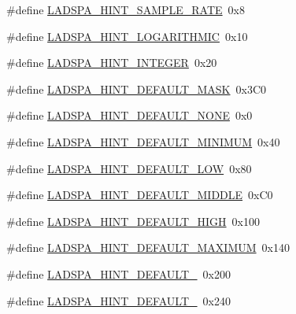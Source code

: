 \begin{DoxyCompactItemize}
\#define \hyperlink{win_2_l_a_d_s_p_a__plugins-win_2ladspa_8h_a184adf73da5ec410abfce239de960826}{L\+A\+D\+S\+P\+A\+\_\+\+H\+I\+N\+T\+\_\+\+S\+A\+M\+P\+L\+E\+\_\+\+R\+A\+TE}~0x8
\item 
\#define \hyperlink{win_2_l_a_d_s_p_a__plugins-win_2ladspa_8h_a98bd5b7702b500dc6cad0fcfe02312a9}{L\+A\+D\+S\+P\+A\+\_\+\+H\+I\+N\+T\+\_\+\+L\+O\+G\+A\+R\+I\+T\+H\+M\+IC}~0x10
\item 
\#define \hyperlink{win_2_l_a_d_s_p_a__plugins-win_2ladspa_8h_a5bf65328a41d04440216bc932fe2bd16}{L\+A\+D\+S\+P\+A\+\_\+\+H\+I\+N\+T\+\_\+\+I\+N\+T\+E\+G\+ER}~0x20
\item 
\#define \hyperlink{win_2_l_a_d_s_p_a__plugins-win_2ladspa_8h_a713062e0f0ae5956e12a217323c2a100}{L\+A\+D\+S\+P\+A\+\_\+\+H\+I\+N\+T\+\_\+\+D\+E\+F\+A\+U\+L\+T\+\_\+\+M\+A\+SK}~0x3\+C0
\item 
\#define \hyperlink{win_2_l_a_d_s_p_a__plugins-win_2ladspa_8h_ae88ecad8aea142f9d970981cf2e011f6}{L\+A\+D\+S\+P\+A\+\_\+\+H\+I\+N\+T\+\_\+\+D\+E\+F\+A\+U\+L\+T\+\_\+\+N\+O\+NE}~0x0
\item 
\#define \hyperlink{win_2_l_a_d_s_p_a__plugins-win_2ladspa_8h_ac5362d0480a9291abaa0e24475a90683}{L\+A\+D\+S\+P\+A\+\_\+\+H\+I\+N\+T\+\_\+\+D\+E\+F\+A\+U\+L\+T\+\_\+\+M\+I\+N\+I\+M\+UM}~0x40
\item 
\#define \hyperlink{win_2_l_a_d_s_p_a__plugins-win_2ladspa_8h_a2396275a1c6a7b3eafd6ef1481723ebb}{L\+A\+D\+S\+P\+A\+\_\+\+H\+I\+N\+T\+\_\+\+D\+E\+F\+A\+U\+L\+T\+\_\+\+L\+OW}~0x80
\item 
\#define \hyperlink{win_2_l_a_d_s_p_a__plugins-win_2ladspa_8h_a8a3c0d1bc5949dec0d8019e4da0c421e}{L\+A\+D\+S\+P\+A\+\_\+\+H\+I\+N\+T\+\_\+\+D\+E\+F\+A\+U\+L\+T\+\_\+\+M\+I\+D\+D\+LE}~0x\+C0
\item 
\#define \hyperlink{win_2_l_a_d_s_p_a__plugins-win_2ladspa_8h_a62f5f84041109facc480dcc1df3023fb}{L\+A\+D\+S\+P\+A\+\_\+\+H\+I\+N\+T\+\_\+\+D\+E\+F\+A\+U\+L\+T\+\_\+\+H\+I\+GH}~0x100
\item 
\#define \hyperlink{win_2_l_a_d_s_p_a__plugins-win_2ladspa_8h_a1205f2b346824c423dee194c8881f805}{L\+A\+D\+S\+P\+A\+\_\+\+H\+I\+N\+T\+\_\+\+D\+E\+F\+A\+U\+L\+T\+\_\+\+M\+A\+X\+I\+M\+UM}~0x140
\item 
\#define \hyperlink{win_2_l_a_d_s_p_a__plugins-win_2ladspa_8h_a372d147a63242bd02a3f8c1266f724d4}{L\+A\+D\+S\+P\+A\+\_\+\+H\+I\+N\+T\+\_\+\+D\+E\+F\+A\+U\+L\+T\+\_}~0x200
\item 
\#define \hyperlink{win_2_l_a_d_s_p_a__plugins-win_2ladspa_8h_aa925dfb5595cf9d5556dbe66b773aa8d}{L\+A\+D\+S\+P\+A\+\_\+\+H\+I\+N\+T\+\_\+\+D\+E\+F\+A\+U\+L\+T\+\_}~0x240

\end{DoxyCompactItemize}

